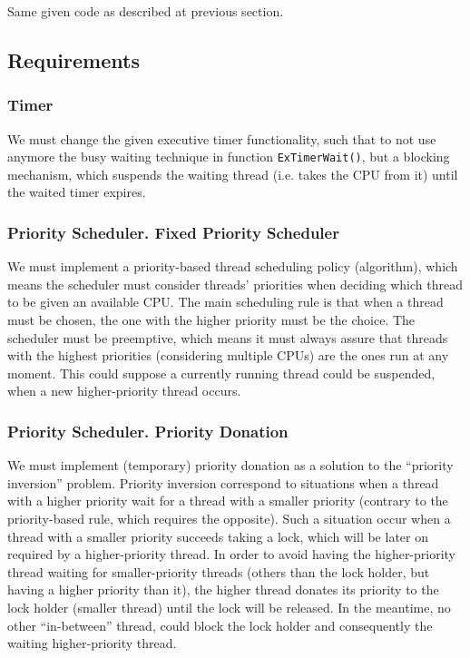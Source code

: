 Same given code as described at previous section. 


\subsection{Requirements}

\subsubsection{Timer}

We must change the given executive timer functionality, such that to not use anymore the busy waiting technique in function \lstinline|ExTimerWait()|, but a blocking mechanism, which suspends the waiting thread (i.e. takes the CPU from it) until the waited timer expires. 

\subsubsection{Priority Scheduler. Fixed Priority Scheduler}
\label{subsubsec:prio-sched}

We must implement a priority-based thread scheduling policy (algorithm), which means the scheduler must consider threads' priorities when deciding which thread to be given an available CPU. The main scheduling rule is that when a thread must be chosen, the one with the higher priority must be the choice. 
The scheduler must be preemptive, which means it must always assure that threads with the highest priorities (considering multiple CPUs) are the ones run at any moment. This could suppose a currently running thread could be suspended, when a new higher-priority thread occurs. 


\subsubsection{Priority Scheduler. Priority Donation}

We must implement (temporary) priority donation as a solution to the ``priority inversion'' problem. Priority inversion correspond to situations when a thread with a higher priority wait for a thread with a smaller priority (contrary to the priority-based rule, which requires the opposite). Such a situation occur when a thread with a smaller priority succeeds taking a lock, which will be later on required by a higher-priority thread. In order to avoid having the higher-priority thread waiting for smaller-priority threads (others than the lock holder, but having a higher priority than it), the higher thread donates its priority to the lock holder (smaller thread) until the lock will be released. In the meantime, no other ``in-between'' thread, could block the lock holder and consequently the waiting higher-priority thread.  

